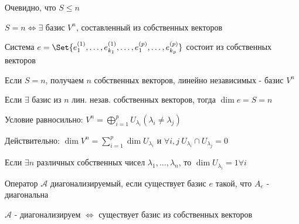 \documentclass[12pt]{article}
\begin{document}
    Очевидно, что $S \leq n$

    \begin{MyTheorem}
        \Ths $S = n \Longleftrightarrow \exists$ базис $V^n$, составленный из собственных векторов
    \end{MyTheorem}

    \begin{MyProof}
        Система $e = \Set{e^{(1)}_1, \dots, e^{(1)}_{k_1}, \dots, e^{(p)}_1, \dots, e^{(p)}_{k_p}}$ состоит из собственных векторов

        Если $S = n$, получаем $n$ собственных векторов, линейно независимых - базис $V^n$

        Если $\exists$ базис из $n$ лин. незав. собственных векторов, тогда $\dim e = S = n$
    \end{MyProof}

    \Nota Условие \Ths равносильно: $V^n = \bigoplus_{i=1}^p U_{\lambda_i} (\lambda_i \neq \lambda_j)$

    Действительно: $\dim V^n = \sum_{i=1}^p \dim U_{\lambda_i}$ и $\forall i, j \ U_{\lambda_i} \cap U_{\lambda_j} = 0$

    \Ex Если $\exists n$ различных собственных чисел $\lambda_1, \dots, \lambda_n$, то $\dim U_{\lambda_i} = 1 \forall i$

    \Def Оператор $\mathcal{A}$ диагонализируемый, если существует базис $e$ такой, что $A_e$ - диагональна

    \hypertarget{diagonalizedmatrixtheorem}{}

    \begin{MyTheorem}
        \Ths $\mathcal{A}$ - диагонализируем $\Longleftrightarrow$ существует базис из собственных векторов
    \end{MyTheorem}
\end{document}
